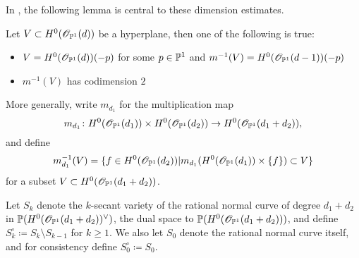 In \cite[Section V.4]{KollarRationalCurves}, the following lemma is central to these dimension estimates.
	\begin{lemma}
		\label{lem:KollarCodimension}
		Let $V \subset H^0(\sO_{\P^1}(d))$ be a hyperplane, then one of the following is true:
		\begin{itemize}
			\item $V = H^0(\sO_{\P^1}(d))(-p)$ for some $p \in \P^1$ and $m^{-1}(V) = H^0(\sO_{\P^1}(d-1))(-p)$
			\item $m^{-1}(V)$ has codimension $2$
		\end{itemize}
	\end{lemma}
%	
%	
	
	More generally, write $m_{d_1}$ for the multiplication map
	\[m_{d_1} \from H^0(\sO_{\P^1}(d_1)) \times H^0(\sO_{\P^1}(d_2)) \to H^0(\sO_{\P^1}(d_1+d_2)),\]
	and define
	\[m_{d_1}^{-1}(V) = \set{f \in H^0(\sO_{\P^1}(d_2)) \vert m_{d_1}(H^0(\sO_{\P^1}(d_1)) \times \set{f}) \subset V }\]
	for a subset $V \subset H^0(\sO_{\P^1}(d_1+d_2))$.
	
	\begin{definition}
		Let $S_k$ denote the $k$-secant variety of the rational normal curve of degree $d_1+d_2$ in $\P(H^0(\sO_{\P^1}(d_1+d_2))^\vee)$, the dual space to $\P(H^0(\sO_{\P^1}(d_1+d_2)))$, and define $S_k^\circ \coloneqq S_k \setminus S_{k-1}$ for $k \geq 1$. We also let $S_0$ denote the rational normal curve itself, and for consistency define $S_0^\circ \coloneqq S_0$. 
	\end{definition}
	

